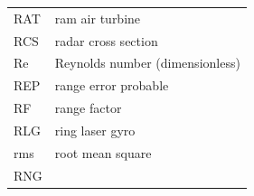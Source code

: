 \documentclass[
]{book}
\begin{document}
\begin{longtable}[]{@{}ll@{}}
\begin{minipage}[t]{0.47\columnwidth}\raggedright
RAT\strut
\end{minipage} & \begin{minipage}[t]{0.47\columnwidth}\raggedright
ram air turbine\strut
\end{minipage}\tabularnewline
\begin{minipage}[t]{0.47\columnwidth}\raggedright
RCS\strut
\end{minipage} & \begin{minipage}[t]{0.47\columnwidth}\raggedright
radar cross section\strut
\end{minipage}\tabularnewline
\begin{minipage}[t]{0.47\columnwidth}\raggedright
Re\strut
\end{minipage} & \begin{minipage}[t]{0.47\columnwidth}\raggedright
Reynolds number (dimensionless)\strut
\end{minipage}\tabularnewline
\begin{minipage}[t]{0.47\columnwidth}\raggedright
REP\strut
\end{minipage} & \begin{minipage}[t]{0.47\columnwidth}\raggedright
range error probable\strut
\end{minipage}\tabularnewline
\begin{minipage}[t]{0.47\columnwidth}\raggedright
RF\strut
\end{minipage} & \begin{minipage}[t]{0.47\columnwidth}\raggedright
range factor\strut
\end{minipage}\tabularnewline
\begin{minipage}[t]{0.47\columnwidth}\raggedright
RLG\strut
\end{minipage} & \begin{minipage}[t]{0.47\columnwidth}\raggedright
ring laser gyro\strut
\end{minipage}\tabularnewline
\begin{minipage}[t]{0.47\columnwidth}\raggedright
rms\strut
\end{minipage} & \begin{minipage}[t]{0.47\columnwidth}\raggedright
root mean square\strut
\end{minipage}\tabularnewline
\begin{minipage}[t]{0.47\columnwidth}\raggedright
RNG\strut
\end{minipage} & \begin{minipage}[t]{0.47\columnwidth}\raggedright

\end{minipage}
\end{longtable}
\end{document}
